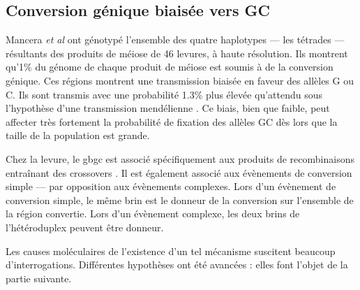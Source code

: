 \documentclass[11pt, oneside]{scrartcl}
\begin{document}
\subsection{Conversion génique biaisée vers GC}
\label{sec:orgheadline7}

Mancera \emph{et al} \cite{mancera_high-resolution_2008} ont génotypé l'ensemble des
quatre haplotypes --- les tétrades --- résultants des produits de méiose de 46
levures, à haute résolution. Ils montrent qu'1\% du génome de chaque produit de
méiose est soumis à de la conversion génique. Ces régions montrent une
transmission biaisée en faveur des allèles G ou C. Ils sont transmis avec une
probabilité 1.3\% plus élevée qu'attendu sous l'hypothèse d'une transmission
mendélienne \cite{mancera_high-resolution_2008}. Ce biais, bien que faible, peut
affecter très fortement la probabilité de fixation des allèles GC dès lors que
la taille de la population est grande\cite{nagylaki_evolution_1983}. 

Chez la levure, le \ac{gbgc} est associé spécifiquement aux produits de
recombinaisons entraînant des crossovers \cite{lesecque_gc-biased_2013}. Il est
également associé aux évènements de conversion simple --- par opposition aux
évènements complexes. Lors d'un évènement de conversion simple, le même brin est
le donneur de la conversion sur l'ensemble de la région convertie. Lors d'un
évènement complexe, les deux brins de l'hétéroduplex peuvent être donneur. 

\begin{transition}
  Les causes moléculaires de l'existence d'un tel mécanisme suscitent beaucoup
  d'interrogations. Différentes hypothèses ont été avancées : elles font l'objet
  de la partie suivante. 
\end{transition}
\end{document}
